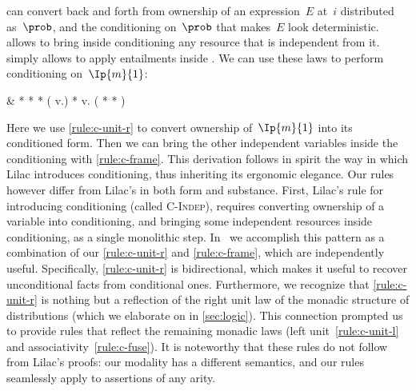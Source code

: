 \documentclass[acmsmall,nonacm,screen,appendix]{acmart}
\begin{document}
 can convert back and forth from
ownership of an expression~$E$ at~$i$ distributed as~$\prob$,
and the conditioning on~$\prob$ that makes~$E$ look deterministic.
 allows to bring inside conditioning
any resource that is independent from it.
 simply allows to apply entailments inside \supercond.
We can use these laws to perform conditioning on~$\Ip{m}{1}$:
\begin{eqexplain}
&
  *
  *
\whichproves
  *
  ( v.)
  *
\whichproves
   v.
  \left(
    *
    *
  \right)
\end{eqexplain}
Here we use \ref{rule:c-unit-r} to convert ownership of~$\Ip{m}{1}$
into its conditioned form.
Then we can bring the other independent variables inside the conditioning
with \ref{rule:c-frame}.
This derivation follows in spirit the way in which Lilac
introduces conditioning, thus inheriting its ergonomic elegance.
Our rules however differ from Lilac's in both form and substance.
First, Lilac's rule for introducing conditioning (called \textsc{C-Indep}),
requires converting ownership of a variable into conditioning, and bringing some independent resources inside conditioning, as a single monolithic step.
In \thelogic\ we accomplish this pattern as a combination of our
\ref{rule:c-unit-r} and \ref{rule:c-frame},
which are independently useful.
Specifically, \ref{rule:c-unit-r} is bidirectional,
which makes it useful to recover unconditional facts from conditional ones.
Furthermore, we recognize that \ref{rule:c-unit-r} is nothing but
a reflection of the right unit law of the monadic structure of distributions
(which we elaborate on in \cref{sec:logic}).
This connection prompted us to provide rules that reflect the remaining
monadic laws (left unit~\ref{rule:c-unit-l} and
associativity~\ref{rule:c-fuse}). It is noteworthy that these rules do not follow from Lilac's proofs:
our modality has a different semantics, and our rules seamlessly apply to
assertions of any arity.
\end{document}
